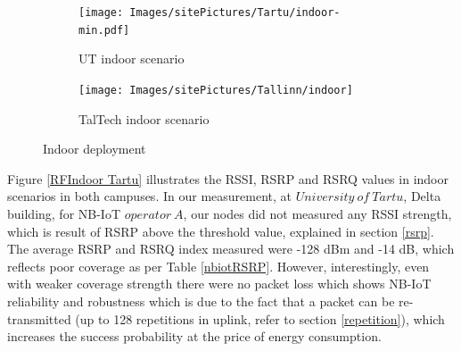 \documentclass[12pt]{article}
\begin{document}
\begin{figure}[H]
\centering
\begin{subfigure}{0.49 \linewidth}
  \centering
  \texttt{[image: Images/sitePictures/Tartu/indoor-min.pdf]}
  \caption{UT indoor scenario}
  \end{subfigure}%
  \begin{subfigure}{0.49 \linewidth}
    \centering
    \texttt{[image: Images/sitePictures/Tallinn/indoor]}
    \caption{TalTech indoor scenario}
  \end{subfigure}
   
    \caption{Indoor deployment}
    \label{fig:Indoor deployment}
\end{figure}

Figure \ref{RFIndoor Tartu} illustrates the RSSI, RSRP and RSRQ values in indoor scenarios in both campuses. In our measurement, at $University\ of\ Tartu$, Delta building, for NB-IoT $operator\ A$, our nodes did not measured any RSSI strength, which is result of RSRP above the threshold value, explained in section \ref{rsrp}. The average RSRP and RSRQ index measured were -128 dBm and -14 dB, which reflects poor coverage as per Table \ref{nbiotRSRP}. However, interestingly, even with weaker coverage strength there were no packet loss which shows NB-IoT reliability and robustness which is due to the fact that a packet can be re-transmitted (up to 128 repetitions in uplink, refer to section \ref{repetition}), which increases the success probability at the price of energy consumption.
\end{document}
